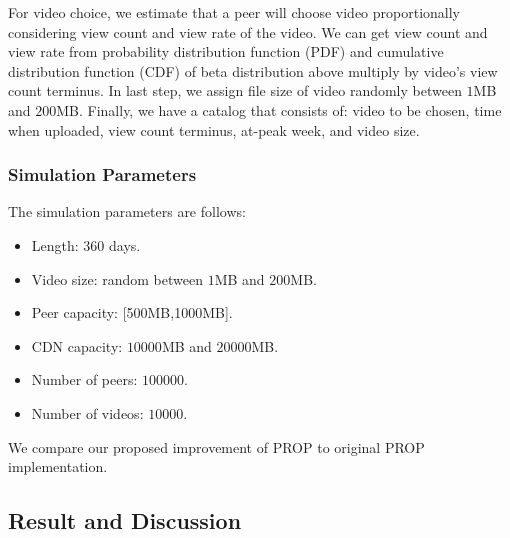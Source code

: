 \documentclass[10pt,final,journal,a4paper]{IEEEtran}
\begin{document}
For video choice, we estimate that a peer will choose video proportionally considering view count and view rate of the video.   
We can get view count and view rate from probability distribution function (PDF) and cumulative distribution function (CDF) of beta distribution above multiply by video's view count terminus.
In last step, we assign file size of video randomly between $1$MB and $200$MB.
Finally, we have a catalog that consists of: video to be chosen, time when uploaded, view count terminus, at-peak week, and video size.


\subsubsection{Simulation Parameters}
The simulation parameters are follows:
\begin{itemize}
\item Length: $360$ days.
\item Video size: random between $1$MB and $200$MB.
\item Peer capacity: [500MB,1000MB].
\item CDN capacity: $10000$MB and $20000$MB.
\item Number of peers: $100000$.
\item Number of videos: $10000$.
\end{itemize}
We compare our proposed improvement of PROP to original PROP \cite{1613869} implementation.



\subsection{Result and Discussion}\label{resultanddiscussion}
\end{document}
